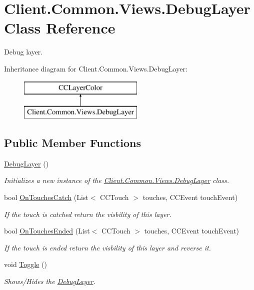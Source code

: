 \hypertarget{classClient_1_1Common_1_1Views_1_1DebugLayer}{}\section{Client.\+Common.\+Views.\+Debug\+Layer Class Reference}
\label{classClient_1_1Common_1_1Views_1_1DebugLayer}


Debug layer.  


Inheritance diagram for Client.\+Common.\+Views.\+Debug\+Layer\+:\begin{figure}[H]
\begin{center}
\leavevmode
\includegraphics[height=2.000000cm]{classClient_1_1Common_1_1Views_1_1DebugLayer}
\end{center}
\end{figure}
\subsection*{Public Member Functions}
\begin{DoxyCompactItemize}
\item 
\hyperlink{classClient_1_1Common_1_1Views_1_1DebugLayer_aebc0fc2352f3bcf40ab868b2d40b5410}{Debug\+Layer} ()
\begin{DoxyCompactList}\small\item\em Initializes a new instance of the \hyperlink{classClient_1_1Common_1_1Views_1_1DebugLayer}{Client.\+Common.\+Views.\+Debug\+Layer} class. \end{DoxyCompactList}\item 
bool \hyperlink{classClient_1_1Common_1_1Views_1_1DebugLayer_af0401e9d4e8aa509b69a20c588623e09}{On\+Touches\+Catch} (List$<$ C\+C\+Touch $>$ touches, C\+C\+Event touch\+Event)
\begin{DoxyCompactList}\small\item\em If the touch is catched return the visbility of this layer. \end{DoxyCompactList}\item 
bool \hyperlink{classClient_1_1Common_1_1Views_1_1DebugLayer_a8d442722772a57fd78afb780cc913b01}{On\+Touches\+Ended} (List$<$ C\+C\+Touch $>$ touches, C\+C\+Event touch\+Event)
\begin{DoxyCompactList}\small\item\em If the touch is ended return the visbility of this layer and reverse it. \end{DoxyCompactList}\item 
void \hyperlink{classClient_1_1Common_1_1Views_1_1DebugLayer_a69438e25d6ce900a8b6f0b6d8c90ba81}{Toggle} ()
\begin{DoxyCompactList}\small\item\em Shows/\+Hides the \hyperlink{classClient_1_1Common_1_1Views_1_1DebugLayer}{Debug\+Layer}. \end{DoxyCompactList}\end{DoxyCompactItemize}



